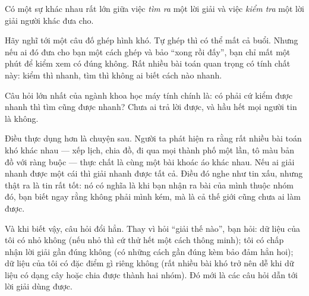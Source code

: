 \documentclass[../../algorithm.tex]{subfiles}
\begin{document}
\begin{dongian}
Có một sự khác nhau rất lớn giữa việc \emph{tìm ra} một lời giải và việc \emph{kiểm tra} một lời giải người khác đưa cho.

Hãy nghĩ tới một câu đố ghép hình khó. Tự ghép thì có thể mất cả buổi. Nhưng nếu ai đó đưa cho bạn một cách ghép và bảo ``xong rồi đấy'', bạn chỉ mất một phút để kiểm xem có đúng không. Rất nhiều bài toán quan trọng có tính chất này: kiểm thì nhanh, tìm thì không ai biết cách nào nhanh.

Câu hỏi lớn nhất của ngành khoa học máy tính chính là: có phải cứ kiểm được nhanh thì tìm cũng được nhanh? Chưa ai trả lời được, và hầu hết mọi người tin là không.

Điều thực dụng hơn là chuyện sau. Người ta phát hiện ra rằng rất nhiều bài toán khó khác nhau --- xếp lịch, chia đồ, đi qua mọi thành phố một lần, tô màu bản đồ với ràng buộc --- thực chất là cùng một bài khoác áo khác nhau. Nếu ai giải nhanh được một cái thì giải nhanh được tất cả. Điều đó nghe như tin xấu, nhưng thật ra là tin rất tốt: nó có nghĩa là khi bạn nhận ra bài của mình thuộc nhóm đó, bạn biết ngay rằng không phải mình kém, mà là cả thế giới cũng chưa ai làm được.

Và khi biết vậy, câu hỏi đổi hẳn. Thay vì hỏi ``giải thế nào'', bạn hỏi: dữ liệu của tôi có nhỏ không (nếu nhỏ thì cứ thử hết một cách thông minh); tôi có chấp nhận lời giải gần đúng không (có những cách gần đúng kèm bảo đảm hẳn hoi); dữ liệu của tôi có đặc điểm gì riêng không (rất nhiều bài khó trở nên dễ khi dữ liệu có dạng cây hoặc chia được thành hai nhóm). Đó mới là các câu hỏi dẫn tới lời giải dùng được.
\end{dongian}
\end{document}
